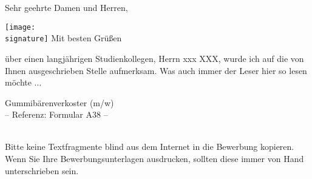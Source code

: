 \clearpage


\date{\today}

\opening{Sehr geehrte Damen und Herren,
} 									%


\closing{\quad\texttt{[image: \\signature]}
\vskip -1.85cm
Mit besten Grüßen} 						%
\vspace*{1cm}							%











\makelettertitle 				%






über einen langjährigen Studienkollegen,  Herrn xxx XXX,  wurde ich auf die von Ihnen ausgeschrieben Stelle aufmerksam.  Was auch immer der Leser hier so lesen möchte ...
\vspace{0.05cm}
\begin{center}
Gummibärenverkoster (m/w)\\
{\scriptsize -- Referenz: Formular A38 --}\\
\end{center}
\blindtext\\
Bitte keine Textfragmente blind aus dem Internet in die Bewerbung kopieren.\\
Wenn Sie Ihre Bewerbungsunterlagen ausdrucken,  sollten diese immer von Hand unterschrieben sein.\\[2cm]

\makeletterclosing			%
\thispagestyle{empty}

\newpage